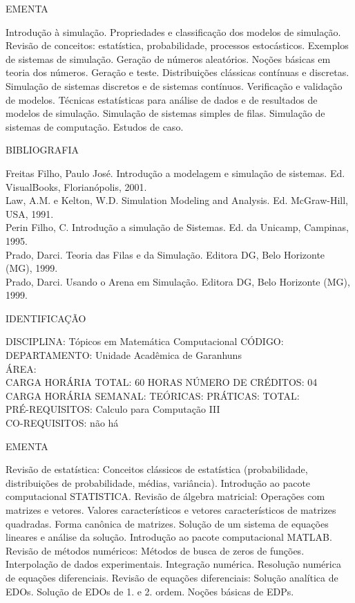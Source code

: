 \documentclass[
	12pt,				%
	openright,			%
  oneside,     %
	a4paper,			%
	chapter=TITLE,		%
	english,			%
	french,				%
	spanish,			%
	brazil				%
	]{abntex2}
\begin{document}
\begin{apendicesenv}
EMENTA 

Introdução à simulação. Propriedades e classificação dos modelos de
simulação. Revisão de conceitos: estatística, probabilidade, processos
estocásticos. Exemplos de sistemas de simulação. Geração de números
aleatórios. Noções básicas em teoria dos números. Geração e teste.
Distribuições clássicas contínuas e discretas. Simulação de sistemas
discretos e de sistemas contínuos. Verificação e validação de modelos.
Técnicas estatísticas para análise de dados e de resultados de modelos
de simulação. Simulação de sistemas simples de filas. Simulação de
sistemas de computação. Estudos de caso.

BIBLIOGRAFIA 

Freitas Filho, Paulo José. Introdução a modelagem e simulação de
sistemas. Ed. VisualBooks, Florianópolis, 2001.\\
Law, A.M. e Kelton, W.D. Simulation Modeling and Analysis. Ed.
McGraw-Hill, USA, 1991.\\
Perin Filho, C. Introdução a simulação de Sistemas. Ed. da Unicamp,
Campinas, 1995.\\
Prado, Darci. Teoria das Filas e da Simulação. Editora DG, Belo
Horizonte (MG), 1999.\\
Prado, Darci. Usando o Arena em Simulação. Editora DG, Belo Horizonte
(MG), 1999.

\newpage IDENTIFICAÇÃO

DISCIPLINA: Tópicos em Matemática Computacional CÓDIGO:\\ 
DEPARTAMENTO: Unidade Acadêmica de Garanhuns\\ 
ÁREA:\\
CARGA HORÁRIA TOTAL: 60 HORAS NÚMERO DE CRÉDITOS: 04\\
CARGA HORÁRIA SEMANAL: TEÓRICAS: PRÁTICAS: TOTAL:\\
PRÉ-REQUISITOS: Calculo para Computação III\\
CO-REQUISITOS: não há

EMENTA 

Revisão de estatística: Conceitos clássicos de estatística
(probabilidade, distribuições de probabilidade, médias, variância).
Introdução ao pacote computacional STATISTICA. Revisão de álgebra
matricial: Operações com matrizes e vetores. Valores característicos e
vetores característicos de matrizes quadradas. Forma canônica de
matrizes. Solução de um sistema de equações lineares e análise da
solução. Introdução ao pacote computacional MATLAB. Revisão de métodos
numéricos: Métodos de busca de zeros de funções. Interpolação de dados
experimentais. Integração numérica. Resolução numérica de equações
diferenciais. Revisão de equações diferenciais: Solução analítica de
EDOs. Solução de EDOs de 1. e 2. ordem. Noções básicas de EDPs.


\end{apendicesenv}
\end{document}
